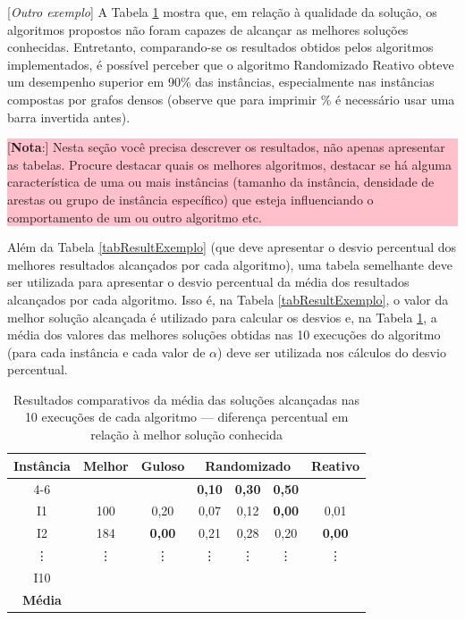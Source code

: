 \documentclass[12pt]{article}
\begin{document}
[\textit{Outro exemplo}] A Tabela \ref{tabResultExemplo2} mostra que, em relação à qualidade da solução, os algoritmos propostos não foram capazes de alcançar as melhores soluções conhecidas. Entretanto, comparando-se os resultados obtidos pelos algoritmos implementados, é possível perceber que o algoritmo Randomizado Reativo obteve um desempenho superior em 90\% das instâncias, especialmente nas instâncias compostas por grafos densos (observe que para imprimir \% é necessário usar uma barra invertida antes).

\colorbox{pink}{
\begin{minipage}[c]{13cm}
[\textbf{Nota}:] Nesta seção você precisa descrever os resultados, não apenas apresentar as tabelas. Procure destacar quais os melhores algoritmos, destacar se há alguma característica de uma ou mais instâncias (tamanho da instância, densidade de arestas ou grupo de instância específico) que esteja influenciando o comportamento de um ou outro algoritmo etc. 
\end{minipage} }

Além da Tabela \ref{tabResultExemplo} (que deve apresentar o desvio percentual dos melhores resultados alcançados por cada algoritmo), uma tabela semelhante deve ser utilizada para apresentar o desvio percentual da média dos resultados alcançados por cada algoritmo. Isso é, na Tabela \ref{tabResultExemplo}, o valor da melhor solução alcançada é utilizado para calcular os desvios e, na Tabela \ref{tabResultExemplo2}, a média dos valores das melhores soluções obtidas nas 10 execuções do algoritmo (para cada instância e cada valor de $\alpha$) deve ser utilizada nos cálculos do desvio percentual.


\begin{table}[htbp]
\centering
\caption{Resultados comparativos da média das soluções alcançadas nas 10 execuções de cada algoritmo — diferença percentual em relação à melhor solução conhecida}
\renewcommand{\arraystretch}{1.2}
{
\footnotesize
\begin{tabular}{|c|c|c|c|c|c|c|}
\hline
\textbf{Instância} & \textbf{Melhor} & \textbf{Guloso} & \multicolumn{3}{c|}{\textbf{Randomizado}} & \textbf{Reativo} \\ \cline{4-6}
 & & &  \multicolumn{1}{c|}{{\bf 0,10}} & \multicolumn{1}{c|}{{\bf 0,30}} & \multicolumn{1}{c|}{{\bf 0,50}} & \\
\hline
I1 & 100 & 0,20 & 0,07 &  0,12 & \textbf{0,00} & 0,01 \\
I2 & 184 & \textbf{0,00} & 0,21 &  0,28 & 0,20 & \textbf{0,00} \\
\vdots & \vdots & \vdots &  \vdots & \vdots & \vdots & \vdots \\
I10 &  &  &  &  &  &  \\
\hline
\textbf{Média} &  &  &  &  &  &  \\
\hline
\end{tabular}
}
\label{tabResultExemplo2}
\end{table}
\end{document}
